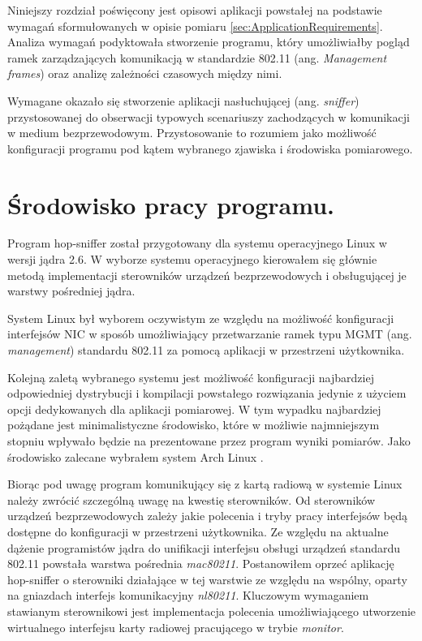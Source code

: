 %
 
Niniejszy rozdział poświęcony jest opisowi aplikacji powstałej na podstawie wymagań sformułowanych w opisie pomiaru \ref{sec:ApplicationRequirements}. Analiza wymagań podyktowała stworzenie programu, który umożliwiałby pogląd ramek zarządzających komunikacją w standardzie 802.11 (ang. \emph{Management frames}) oraz analizę zależności czasowych między nimi. 

Wymagane okazało się stworzenie aplikacji nasłuchującej (ang. \emph{sniffer}) przystosowanej do obserwacji typowych scenariuszy zachodzących w komunikacji w medium bezprzewodowym. Przystosowanie to rozumiem jako możliwość konfiguracji programu pod kątem wybranego zjawiska i środowiska pomiarowego. 

\section{Środowisko pracy programu.}
\label{sec:ProgramEnviroment}

Program hop-sniffer został przygotowany dla systemu operacyjnego Linux w wersji jądra 2.6. W wyborze systemu operacyjnego kierowałem się głównie metodą implementacji sterowników urządzeń bezprzewodowych i obsługującej je warstwy pośredniej jądra. 

System Linux był wyborem oczywistym ze względu na możliwość konfiguracji interfejsów NIC w sposób umożliwiający przetwarzanie ramek typu MGMT (ang. \emph{management}) standardu 802.11 za pomocą aplikacji w przestrzeni użytkownika.

Kolejną zaletą wybranego systemu jest możliwość konfiguracji najbardziej odpowiedniej dystrybucji i kompilacji powstałego rozwiązania jedynie z użyciem opcji dedykowanych dla aplikacji pomiarowej. W tym wypadku najbardziej pożądane jest minimalistyczne środowisko, które w możliwie najmniejszym stopniu wpływało będzie na prezentowane przez program wyniki pomiarów. Jako środowisko zalecane wybrałem system Arch Linux \cite{www:ArchLinux}.

Biorąc pod uwagę program komunikujący się z kartą radiową w systemie Linux należy zwrócić szczególną uwagę na kwestię sterowników. Od sterowników urządzeń bezprzewodowych zależy jakie polecenia i tryby pracy interfejsów będą dostępne do konfiguracji w przestrzeni użytkownika. Ze względu na aktualne dążenie programistów jądra do unifikacji interfejsu obsługi urządzeń standardu 802.11 powstała warstwa pośrednia \emph{mac80211}. Postanowiłem oprzeć aplikację hop-sniffer o sterowniki działające w tej warstwie ze względu na wspólny, oparty na gniazdach interfejs komunikacyjny \emph{nl80211}. Kluczowym wymaganiem stawianym sterownikowi jest implementacja polecenia umożliwiającego utworzenie wirtualnego interfejsu karty radiowej pracującego w trybie \emph{monitor}.

